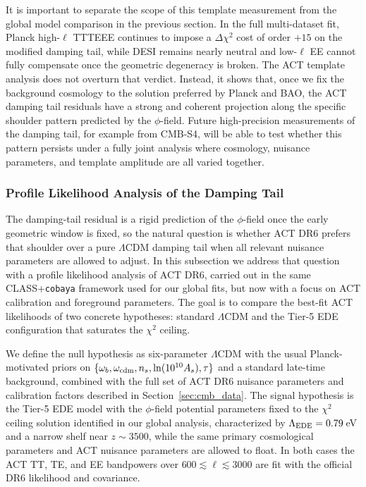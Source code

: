 \documentclass[a4paper,11pt]{article}
\begin{document}
It is important to separate the scope of this template measurement from the global model comparison in the previous section. In the full multi-dataset fit, Planck high-$\ell$ TTTEEE continues to impose a $\Delta\chi^2$ cost of order $+15$ on the modified damping tail, while DESI remains nearly neutral and low-$\ell$ EE cannot fully compensate once the geometric degeneracy is broken. The ACT template analysis does not overturn that verdict. Instead, it shows that, once we fix the background cosmology to the solution preferred by Planck and BAO, the ACT damping tail residuals have a strong and coherent projection along the specific shoulder pattern predicted by the $\phi$-field. Future high-precision measurements of the damping tail, for example from CMB-S4, will be able to test whether this pattern persists under a fully joint analysis where cosmology, nuisance parameters, and template amplitude are all varied together.

\subsubsection{Profile Likelihood Analysis of the Damping Tail}
\label{sec:profile_likelihood}

The damping-tail residual is a rigid prediction of the $\phi$-field once the early geometric window is fixed, so the natural question is whether ACT DR6 prefers that shoulder over a pure $\Lambda$CDM damping tail when all relevant nuisance parameters are allowed to adjust. In this subsection we address that question with a profile likelihood analysis of ACT DR6, carried out in the same CLASS+\texttt{cobaya} framework used for our global fits, but now with a focus on ACT calibration and foreground parameters. The goal is to compare the best-fit ACT likelihoods of two concrete hypotheses: standard $\Lambda$CDM and the Tier-5 EDE configuration that saturates the $\chi^2$ ceiling.

We define the null hypothesis as six-parameter $\Lambda$CDM with the usual Planck-motivated priors on $\{\omega_b,\omega_{\rm cdm},n_s,\ln(10^{10}A_s),\tau\}$ and a standard late-time background, combined with the full set of ACT DR6 nuisance parameters and calibration factors described in Section~\ref{sec:cmb_data}. The signal hypothesis is the Tier-5 EDE model with the $\phi$-field potential parameters fixed to the $\chi^2$ ceiling solution identified in our global analysis, characterized by $\Lambda_{\rm EDE}=0.79$\,eV and a narrow shelf near $z \sim 3500$, while the same primary cosmological parameters and ACT nuisance parameters are allowed to float. In both cases the ACT TT, TE, and EE bandpowers over $600 \lesssim \ell \lesssim 3000$ are fit with the official DR6 likelihood and covariance.
\end{document}

